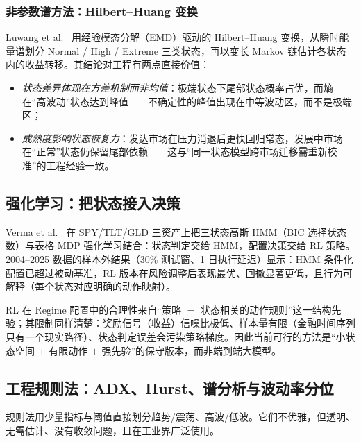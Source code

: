 \subsubsection{非参数谱方法：Hilbert--Huang 变换}

Luwang et al.~\cite{luwang2026} 用经验模态分解（EMD）驱动的 Hilbert--Huang 变换，从瞬时能量谱划分 Normal / High / Extreme 三类状态，再以变长 Markov 链估计各状态内的收益转移。其结论对工程有两点直接价值：
\begin{itemize}[itemsep=2pt]
\item \emph{状态差异体现在方差机制而非均值}：极端状态下尾部状态概率占优，而熵在“高波动”状态达到峰值——不确定性的峰值出现在中等波动区，而不是极端区；
\item \emph{成熟度影响状态恢复力}：发达市场在压力消退后更快回归常态，发展中市场在“正常”状态仍保留尾部依赖——这与“同一状态模型跨市场迁移需重新校准”的工程经验一致。
\end{itemize}

\subsection{强化学习：把状态接入决策}

Verma et al.~\cite{verma2026} 在 SPY/TLT/GLD 三资产上把三状态高斯 HMM（BIC 选择状态数）与表格 MDP 强化学习结合：状态判定交给 HMM，配置决策交给 RL 策略。2004--2025 数据的样本外结果（30\% 测试窗、1 日执行延迟）显示：HMM 条件化配置已超过被动基准，RL 版本在风险调整后表现最优、回撤显著更低，且行为可解释（每个状态对应明确的动作映射）。

\begin{remark}[RL 路线的诚实边界]
RL 在 Regime 配置中的合理性来自“策略 $=$ 状态相关的动作规则”这一结构先验；其限制同样清楚：奖励信号（收益）信噪比极低、样本量有限（金融时间序列只有一个现实路径）、状态判定误差会污染策略梯度。因此当前可行的方法是“小状态空间 $+$ 有限动作 $+$ 强先验”的保守版本，而非端到端大模型。
\end{remark}

\subsection{工程规则法：ADX、Hurst、谱分析与波动率分位}

规则法用少量指标与阈值直接划分趋势/震荡、高波/低波。它们不优雅，但透明、无需估计、没有收敛问题，且在工业界广泛使用。


